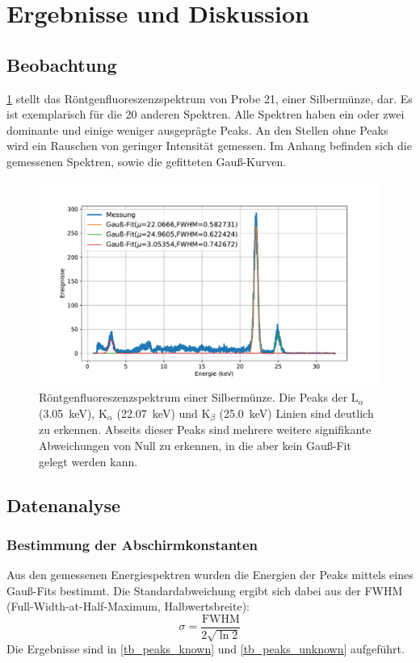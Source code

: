 \documentclass[
	a4paper,
	12pt,
	pagesize,
	ngerman
]{scrartcl}
\begin{document}
	\section{Ergebnisse und Diskussion}


	\subsection{Beobachtung}
	\cref{fig_ag_plot} stellt das Röntgenfluoreszenzspektrum von Probe 21, einer Silbermünze, dar.
	Es ist exemplarisch für die 20 anderen Spektren.
	Alle Spektren haben ein oder zwei dominante und einige weniger ausgeprägte Peaks.
	An den Stellen ohne Peaks wird ein Rauschen von geringer Intensität gemessen.
	Im Anhang befinden sich die gemessenen Spektren, sowie die gefitteten Gauß-Kurven.
	\begin{figure}[H]
		\includegraphics[width=1.0\textwidth]{images/21-Ag}
		\centering
		\caption{Röntgenfluoreszenzspektrum einer Silbermünze. Die Peaks der $\text{L}_\alpha$ (\SI{3,05}{\kilo \electronvolt}), $\text{K}_\alpha$ (\SI{22,07}{\kilo \electronvolt}) und $\text{K}_\beta$ (\SI{25,0}{\kilo \electronvolt}) Linien sind deutlich zu erkennen. Abseits dieser Peaks sind mehrere weitere signifikante Abweichungen von Null zu erkennen, in die aber kein Gauß-Fit gelegt werden kann.}
		\label{fig_ag_plot}
		\centering
	\end{figure}

	\subsection{Datenanalyse}
	\subsubsection{Bestimmung der Abschirmkonstanten}
	Aus den gemessenen Energiespektren wurden die Energien der Peaks mittels eines Gauß-Fits bestimmt.
	Die Standardabweichung ergibt sich dabei aus der FWHM (Full-Width-at-Half-Maximum, Halbwertsbreite):
	\begin{equation}
		\sigma = \frac{\text{FWHM}}{2\sqrt{\ln 2}}
	\end{equation}
	Die Ergebnisse sind in \cref{tb_peaks_known} und \cref{tb_peaks_unknown} aufgeführt.
\end{document}
